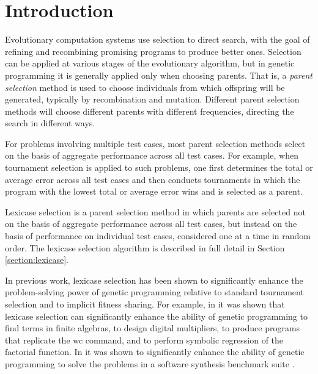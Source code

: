 \documentclass{sig-alternate}
\begin{document}

%
%

%
%
\printccsdesc



\section{Introduction}
\label{section:introduction}

Evolutionary computation systems use selection to direct search, with the goal of refining and recombining promising programs to produce better ones. Selection can be applied at various stages of the evolutionary algorithm, but in genetic programming it is generally applied only when choosing parents. That is, a \emph{parent selection} method is used to choose individuals from which offspring will be generated, typically by recombination and mutation. Different parent selection methods will choose different parents with different frequencies, directing the search in different ways.

For problems involving multiple test cases, most parent selection methods select on the basis of aggregate performance across all test cases. For example, when tournament selection is applied to such problems, one first determines the total or average error across all test cases and then conducts tournaments in which the program with the lowest total or average error wins and is selected as a parent.

Lexicase selection is a parent selection method in which parents are selected not on the basis of aggregate performance across all test cases, but instead on the basis of performance on individual test cases, considered one at a time in random order. The lexicase selection algorithm is described in full detail in Section \ref{section:lexicase}.

In previous work, lexicase selection has been shown to significantly enhance the problem-solving power of genetic programming relative to standard tournament selection and to implicit fitness sharing. For example, in \cite{Helmuth:2014:ieeeTEC} it was shown that lexicase selection can significantly enhance the ability of genetic programming to find terms in finite algebras, to design digital multipliers, to produce programs that replicate the {\ttfamily wc} command, and to perform symbolic regression of the factorial function. In \cite{Helmuth:2015:dissertation} it was shown to significantly enhance the ability of genetic programming to solve the problems in a software synthesis benchmark suite \cite{Helmuth:2015:GECCO}.
\end{document}
